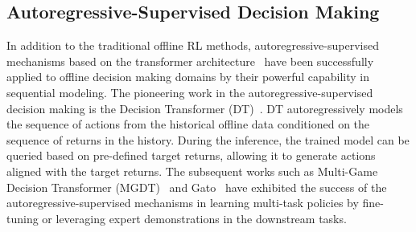 \subsection{Autoregressive-Supervised Decision Making}
%
In addition to the traditional offline RL methods, autoregressive-supervised mechanisms based on the transformer architecture~\citep{vaswani2017attention} have been successfully applied to offline decision making domains by their powerful capability in sequential modeling.
%
The pioneering work in the autoregressive-supervised decision making is the Decision Transformer (DT)~\citep{chen2021decision}.
%
DT autoregressively models the sequence of actions from the historical offline data conditioned on the sequence of returns in the history.
%
%
During the inference, the trained model can be queried based on pre-defined target returns, allowing it to generate actions aligned with the target returns.
%
The subsequent works such as Multi-Game Decision Transformer (MGDT)~\citep{lee2022multi} and Gato~\citep{reed2022generalist} have exhibited the success of the autoregressive-supervised mechanisms in learning multi-task policies by fine-tuning or leveraging expert demonstrations in the downstream tasks.






